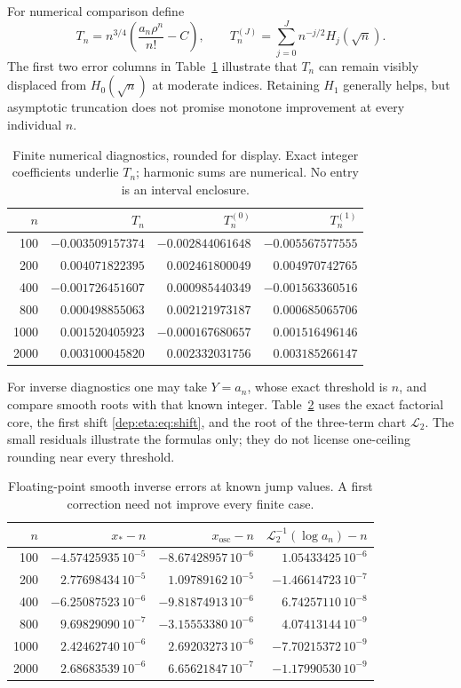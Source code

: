 \documentclass[11pt]{article}
\theoremstyle{definition}\newtheorem{definition}[theorem]{Definition}
\theoremstyle{remark}\newtheorem{remark}[theorem]{Remark}
\begin{document}
For numerical comparison define
\[
 T_n=n^{3/4}\left(\frac{a_n\rho^n}{n!}-C\right),\qquad
 T_n^{(J)}=\sum_{j=0}^Jn^{-j/2}H_j(\sqrt n).
\]
The first two error columns in Table~\ref{dep:eta:tab:coeffdiag} illustrate that
$T_n$ can remain visibly displaced from $H_0(\sqrt n)$ at moderate
indices. Retaining $H_1$ generally helps, but asymptotic truncation
does not promise monotone improvement at every individual $n$.
\begin{table}[htbp]
\centering
\small
\begin{tabular}{r r r r}
\toprule
$n$ & $T_n$ & $T_n^{(0)}$ & $T_n^{(1)}$\\
\midrule
100   & $-0.003509157374$ & $-0.002844061648$ & $-0.005567577555$\\
200   & $ 0.004071822395$ & $ 0.002461800049$ & $ 0.004970742765$\\
400   & $-0.001726451607$ & $ 0.000985440349$ & $-0.001563360516$\\
800   & $ 0.000498855063$ & $ 0.002121973187$ & $ 0.000685065706$\\
1000  & $ 0.001520405923$ & $-0.000167680657$ & $ 0.001516496146$\\
2000  & $ 0.003100045820$ & $ 0.002332031756$ & $ 0.003185266147$\\
\bottomrule
\end{tabular}
\caption{Finite numerical diagnostics, rounded for display.
Exact integer coefficients underlie $T_n$; harmonic sums are numerical.
No entry is an interval enclosure.}\label{dep:eta:tab:coeffdiag}
\end{table}

For inverse diagnostics one may take $Y=a_n$, whose exact threshold
is $n$, and compare smooth roots with that known integer.
Table~\ref{dep:eta:tab:inversediag} uses the exact factorial core, the first
shift \eqref{dep:eta:eq:shift}, and the root of the three-term chart
$\mathcal L_2$. The small residuals illustrate the formulas only;
they do not license one-ceiling rounding near every threshold.
\begin{table}[htbp]
\centering
\small
\begin{tabular}{r r r r}
\toprule
$n$ & $x_*-n$ & $x_{\mathrm{osc}}-n$ & $\mathcal L_2^{-1}(\log a_n)-n$\\
\midrule
100  & $-4.57425935\,10^{-5}$ & $-8.67428957\,10^{-6}$ & $ 1.05433425\,10^{-6}$\\
200  & $ 2.77698434\,10^{-5}$ & $ 1.09789162\,10^{-5}$ & $-1.46614723\,10^{-7}$\\
400  & $-6.25087523\,10^{-6}$ & $-9.81874913\,10^{-6}$ & $ 6.74257110\,10^{-8}$\\
800  & $ 9.69829090\,10^{-7}$ & $-3.15553380\,10^{-6}$ & $ 4.07413144\,10^{-9}$\\
1000 & $ 2.42462740\,10^{-6}$ & $ 2.69203273\,10^{-6}$ & $-7.70215372\,10^{-9}$\\
2000 & $ 2.68683539\,10^{-6}$ & $ 6.65621847\,10^{-7}$ & $-1.17990530\,10^{-9}$\\
\bottomrule
\end{tabular}
\caption{Floating-point smooth inverse errors at known jump values.
A first correction need not improve every finite case.}\label{dep:eta:tab:inversediag}
\end{table}
\end{document}
